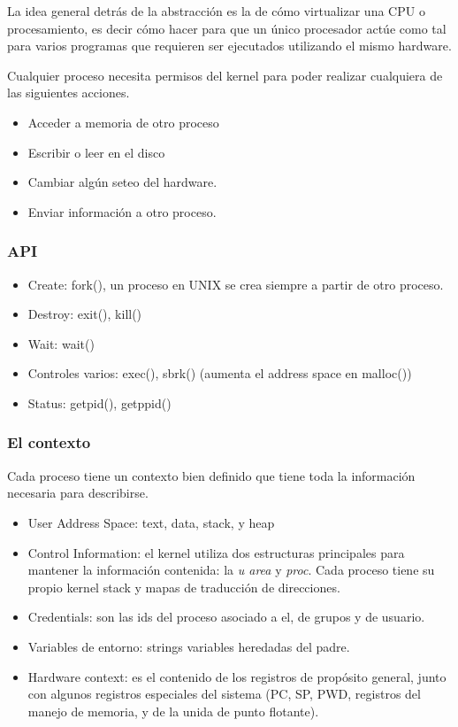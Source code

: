 \documentclass[titlepage,a4paper]{article}
\begin{document}
La idea general detrás de la abstracción es la de cómo virtualizar una CPU o procesamiento, es decir cómo hacer para que un único procesador actúe como tal para varios programas que requieren ser ejecutados utilizando el mismo hardware.

Cualquier proceso necesita permisos del kernel para poder realizar cualquiera de las siguientes acciones.
\begin{itemize}
    \item Acceder a memoria de otro proceso
    \item Escribir o leer en el disco
    \item Cambiar algún seteo del hardware.
    \item Enviar información a otro proceso.
\end{itemize}

\subsubsection*{API}
\begin{itemize}
    \item Create: fork(), un proceso en UNIX se crea siempre a partir de otro proceso.
    \item Destroy: exit(), kill()
    \item Wait: wait()
    \item Controles varios: exec(), sbrk() (aumenta el address space en malloc())
    \item Status: getpid(), getppid()
\end{itemize}

\subsubsection*{El contexto}
Cada proceso tiene un contexto bien definido que tiene toda la información necesaria para describirse.
\begin{itemize}
    \item User Address Space: text, data, stack, y heap
    \item Control Information: el kernel utiliza dos estructuras principales para mantener la información contenida: la \textit{u area} y \textit{proc}. Cada proceso tiene su propio kernel stack y mapas de traducción de direcciones.
    \item Credentials: son las ids del proceso asociado a el, de grupos y de usuario.
    \item Variables de entorno: strings variables heredadas del padre.
    \item Hardware context: es el contenido de los registros de propósito general, junto con algunos registros especiales del sistema (PC, SP, PWD, registros del manejo de memoria, y de la unida de punto flotante).
\end{itemize}
\end{document}

